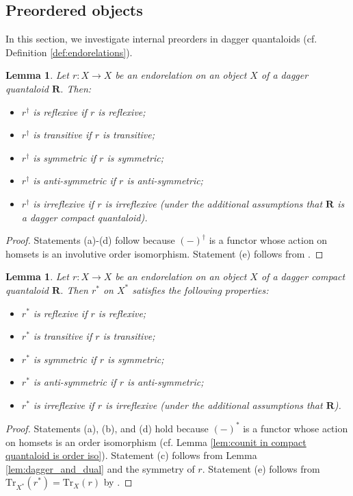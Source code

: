 \documentclass[12pt]{tac}
\newtheorem{lemma}[theorem]{Lemma}
\theoremstyle{definition}
\theoremstyle{remark}
\newcommand{\<}{\langle}
\renewcommand{\>}{\rangle}
\renewcommand{\:}{\colon}
\newcommand{\Tr}{\mathrm{Tr}}
\begin{document}
\subsection{Preordered objects}

In this section, we investigate internal preorders in dagger quantaloids (cf. Definition \ref{def:endorelations}). 

\begin{lemma}\label{lem:opposite relation}
    Let $r:X\to X$ be an endorelation on an object $X$ of a dagger quantaloid $\mathbf R$. Then:
    \begin{itemize}
        \item[(a)] $r^\dag$ is reflexive if $r$ is reflexive;
        \item[(b)] $r^\dag$ is transitive if $r$ is transitive;
        \item[(c)] $r^\dag$ is symmetric if $r$ is symmetric;
        \item[(d)] $r^\dag$ is anti-symmetric if $r$ is anti-symmetric;
        \item[(e)] $r^\dag$ is irreflexive if $r$ is irreflexive (under the additional assumptions that $\mathbf R$ is a dagger compact quantaloid).
    \end{itemize}
\end{lemma}
\begin{proof}
Statements (a)-(d) follow because $(-)^\dag$ is a functor whose action on homsets is an involutive order isomorphism. Statement (e) follows from \cite[Lemma 3.63(f)]{heunenvicary}.
\end{proof}


\begin{lemma}\label{lem:dual relation}
    Let $r:X\to X$ be an endorelation on an object $X$ of a dagger compact quantaloid $\mathbf R$. Then $r^*$ on $X^*$ satisfies the following properties:
    \begin{itemize}
        \item[(a)] $r^*$ is reflexive if $r$ is reflexive;
        \item[(b)] $r^*$ is transitive if $r$ is transitive;
        \item[(c)] $r^*$ is symmetric if $r$ is symmetric;
        \item[(d)] $r^*$ is anti-symmetric if $r$ is anti-symmetric;
        \item[(e)] $r^*$ is irreflexive if $r$ is irreflexive (under the additional assumptions that $\mathbf R$).
    \end{itemize}
\end{lemma}
\begin{proof}
Statements (a), (b), and (d) hold because $(-)^*$ is a functor whose action on homsets is an order isomorphism (cf. Lemma \ref{lem:counit in compact quantaloid is order iso}). Statement (c) follows from Lemma \ref{lem:dagger_and_dual} and the symmetry of $r$. Statement (e) follows from$\Tr_{X^*}(r^*)=\Tr_X(r)$ by \cite[Exercise 3.12(c)]{heunenvicary}.
\end{proof}
\end{document}
